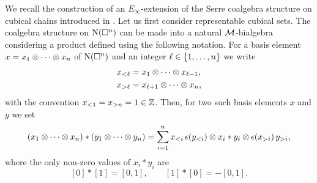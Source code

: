 We recall the construction of an $E_\infty$-extension of the Serre coalgebra structure on cubical chains introduced in \cite{medina2022cube_einfty}.
Let us first consider representable cubical sets.
The coalgebra structure on $\operatorname{N}(\square^n)$ can be made into a natural $\mathcal{M}$-bialgebra considering a product defined using the following notation.
For a basis element $x = x_1 \otimes \dotsb \otimes x_n$ of $\operatorname{N}(\square^n)$ and an integer $\ell \in \{1,\dots,n\}$ we write
\begin{align*}
	x_{<\ell} & = x_1 \otimes \dotsb \otimes x_{\ell-1}, \\
	x_{>\ell} & = x_{\ell+1} \otimes \dotsb \otimes x_n,
\end{align*}
with the convention $x_{<1} = x_{>n} = 1 \in \mathbb{Z}$.
Then, for two such basis elements $x$ and $y$ we set
\begin{equation}\label{eq:product on cubes}
	(x_1 \otimes \dotsb \otimes x_n) \ast (y_1 \otimes \dotsb \otimes y_n) =
	\sum_{i=1}^n x_{<i}\, \epsilon(y_{<i}) \otimes x_i \ast y_i \otimes \epsilon(x_{>i}) \, y_{>i},
\end{equation}
where the only non-zero values of $x_i \ast y_i$ are
\[
[0] \ast [1] = [0, 1], \qquad [1] \ast [0] = -[0, 1].
\]
